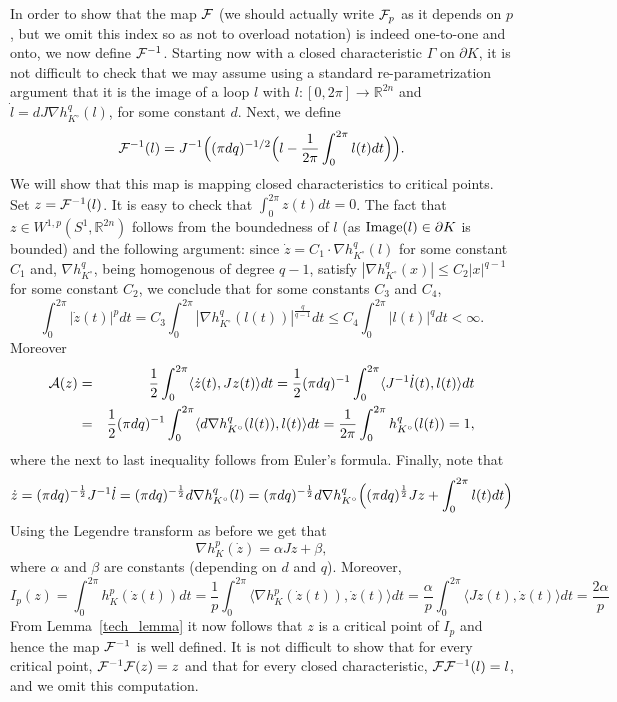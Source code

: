 \documentclass[12pt]{article}
\begin{document}
In order to show that the map  ${\cal F}$ (we should actually write
${\cal F}_{p}$ as it depends on $p$, but we omit this index so as
not to overload notation) is indeed one-to-one and onto, we now
define ${\cal F}^{-1}$. Starting now with a closed characteristic
$\Gamma$ on $\partial K$, it is not difficult to check that we may
assume using a standard re-parametrization argument that it is the
image of a loop $l$ with $l:[0,2 \pi] \rightarrow {\mathbb R}^{2n}$
and $\dot l = d J \nabla h_{K^{\circ}}^q(l)$, for some constant $d$.
Next, we define
\[{\cal F}^{-1}(l) = J^{-1} \Bigl ((\pi d q)^{-1/2} \Bigl (l - {\frac
1 {2\pi}} \int_0^{2\pi} l(t)dt \Bigr ) \Bigr ).\] We will show that
this map is mapping closed characteristics to critical points. Set
$z={\cal F}^{-1}(l)$. It is easy to check that $\int_0^{2 \pi}
z(t)dt=0$. The fact that $z \in W^{1,p}(S^1, {\mathbb R}^{2n})$
follows from the boundedness of $l$ (as ${\rm Image}(l) \in \partial
K$ is bounded) and the following argument: since $\dot z = {C_1}
\cdot \nabla h_{K^{\circ}}^q(l)$ for some constant $C_1$ and,
$\nabla h_{K^{\circ}}^q$, being homogenous of degree $q-1$, satisfy
$|\nabla h_{K^{\circ}}^q(x)| \le C_2 |x|^{q-1}$ for some constant
$C_2$, we conclude that for some constants $C_3$ and $C_4$,
%
\[
\int_0^{2\pi} |\dot{z}(t)|^pdt = C_3 \int_0^{2\pi} |\nabla
h_{K^{\circ}}^q(l(t))|^{\frac q {q-1}}dt \le C_4 \int_0^{2\pi}
|l(t)|^qdt < \infty.
\]
Moreover
\begin{eqnarray*} {\cal A}(z) & = & {\frac 1 2} \int_0^{2\pi}
\langle \dot z(t), Jz(t) \rangle dt = {\frac 1 2} (\pi d q)^{-1}
\int_0^{2\pi} \langle J^{-1} \dot l(t), l(t) \rangle dt \\ & = &
{\frac 1 2} (\pi d q)^{-1} \int_0^{2\pi} \langle d \nabla
h_{K^{\circ}}^q(l(t)), l(t) \rangle dt = {\frac 1 {2 \pi}}
\int_0^{2\pi} h_{K^{\circ}}^q(l(t)) =1,
\end{eqnarray*}
where the next to last inequality follows from Euler's formula.
Finally, note that
%
\[ \dot z = (\pi d q)^{-\frac {1} 2} J^{-1} \dot l = (\pi
d q)^{-\frac {1} 2} d \nabla h_{K^{\circ}}^q(l)= (\pi d q)^{-\frac
{1} 2} d \nabla h_{K^{\circ}}^q \Bigl((\pi d q)^{\frac 1
2}Jz+\int_0^{2\pi} l(t)dt \Bigr)\]
%
Using the Legendre transform as before we get that
$$ \nabla h_K^p( \dot z) = \alpha Jz + \beta,$$ where
$\alpha$ and $\beta$ are constants (depending on $d$ and $q$).
Moreover,
$$ I_p(z) = \int_0^{2 \pi} h_K^p(\dot{z}(t))dt = {\frac 1 p}
\int_0^{2 \pi} \langle \nabla h_K^p(\dot{z}(t)), \dot z(t) \rangle
dt = {\frac {\alpha} p} \int_0^{2 \pi} \langle  Jz(t), \dot z(t)
\rangle dt ={\frac {2 \alpha} p}
$$
From Lemma~\ref{tech_lemma} it now follows that $z$ is a critical
point of $I_p$ and hence the map ${\cal F}^{-1}$ is well defined.
It is not difficult to show that for every critical point, ${\cal
F}^{-1} {\cal F} (z) = z$ and that for every closed characteristic,
${\cal F} {\cal F}^{-1} (l) = l$, and we omit this computation.
\end{document}
